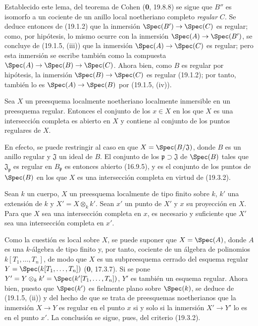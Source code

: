 Establecido este lema, del teorema de Cohen (\textbf{0}, 19.8.8) se sigue que $B''$ es isomorfo a un cociente de un anillo local noetheriano completo \emph{regular} $C$. Se deduce entonces de (19.1.2) que la inmersión $\Spec(B')\to\Spec(C)$ es regular; como, por hipótesis, lo mismo ocurre con la inmersión $\Spec(A)\to\Spec(B')$, se concluye de (19.1.5, (iii)) que la inmersión $\Spec(A)\to\Spec(C)$ es regular; pero esta inmersión se escribe también como la compuesta $\Spec(A)\to\Spec(B)\to\Spec(C)$. Ahora bien, como $B$ es regular por hipótesis, la inmersión $\Spec(B)\to\Spec(C)$ es regular (19.1.2); por tanto, también lo es $\Spec(A)\to\Spec(B)$ por (19.1.5, (iv)).

\begin{corollary}[19.3.3]
\label{IV.19.3.3}
Sea $X$ un preesquema localmente noetheriano localmente inmersible en un preesquema regular. Entonces el conjunto de los $x\in X$ en los que $X$ es una intersección completa es abierto en $X$ y contiene al conjunto de los puntos regulares de $X$.
\end{corollary}

En efecto, se puede restringir al caso en que $X=\Spec(B/\mathfrak J)$, donde $B$ es un anillo regular y $\mathfrak J$ un ideal de $B$. El conjunto de los $\mathfrak p\supset\mathfrak J$ de $\Spec(B)$ tales que $\mathfrak J_{\mathfrak p}$ es regular en $B_{\mathfrak p}$ es entonces abierto (16.9.5), y es el conjunto de los puntos de $\Spec(B)$ en los que $X$ es una intersección completa en virtud de (19.3.2).

\begin{corollary}[19.3.4]
\label{IV.19.3.4}
Sean $k$ un cuerpo, $X$ un preesquema localmente de tipo finito sobre $k$, $k'$ una extensión de $k$ y $X'=X\otimes_k k'$. Sean $x'$ un punto de $X'$ y $x$ su proyección en $X$. Para que $X$ sea una intersección completa en $x$, es necesario y suficiente que $X'$ sea una intersección completa en $x'$.
\end{corollary}

Como la cuestión es local sobre $X$, se puede suponer que $X=\Spec(A)$, donde $A$ es una $k$-álgebra de tipo finito y, por tanto, cociente de un álgebra de polinomios $k[T_1,\ldots,T_n]$, de modo que $X$ es un subpreesquema cerrado del esquema regular $Y=\Spec(k[T_1,\ldots,T_n])$ (\textbf{0}, 17.3.7). Si se pone $Y'=Y\otimes_k k'=\Spec(k'[T_1,\ldots,T_n])$, $Y'$ es también un esquema regular. Ahora bien, puesto que $\Spec(k')$ es fielmente plano sobre $\Spec(k)$, se deduce de (19.1.5, (ii)) y del hecho de que se trata de preesquemas noetherianos que la inmersión $X\to Y$ es regular en el punto $x$ si y solo si la inmersión $X'\to Y'$ lo es en el punto $x'$. La conclusión se sigue, pues, del criterio (19.3.2).

